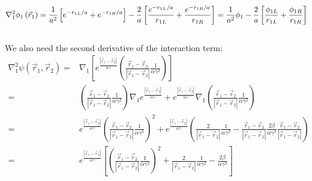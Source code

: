  \begin{align}
 \nabla _1^2{\phi _1}\left( {{{\vec r}_1}} \right) = \frac{1}{{{a^2}}}\left[ {{e^{ - {{{r_{1L}}} \mathord{\left/
  {\vphantom {{{r_{1L}}} a}} \right.
  \kern-\nulldelimiterspace} a}}} + {e^{ - {{{r_{1R}}} \mathord{\left/
  {\vphantom {{{r_{1R}}} a}} \right.
  \kern-\nulldelimiterspace} a}}}} \right] - \frac{2}{a}\left[ {\frac{{{e^{ - {{{r_{1L}}} \mathord{\left/
  {\vphantom {{{r_{1L}}} a}} \right.
  \kern-\nulldelimiterspace} a}}}}}{{{r_{1L}}}} + \frac{{{e^{ - {{{r_{1R}}} \mathord{\left/
  {\vphantom {{{r_{1R}}} a}} \right.
  \kern-\nulldelimiterspace} a}}}}}{{{r_{1R}}}}} \right] = \frac{1}{{{a^2}}}{\phi _1} - \frac{2}{a}\left[ {\frac{{{\phi _{1L}}}}{{{r_{1L}}}} + \frac{{{\phi _{1R}}}}{{{r_{1R}}}}} \right]
 \end{align}\\
 We also need the second derivative of the interaction term:
 \begin{align}
 \nabla _1^2\psi \left( {{{\vec r}_1},{{\vec r}_2}} \right) =&  \nabla _1^{}\left[ {{e^{\frac{{\left| {{{\vec r}_1} - {{\vec r}_2}} \right|}}{{\alpha \gamma }}}}\left( {\frac{{{{\vec r}_1} - {{\vec r}_2}}}{{\left| {{{\vec r}_1} - {{\vec r}_2}} \right|}}\frac{1}{{\alpha {\gamma ^2}}}} \right)} \right]\\
  =& \left( {\frac{{{{\vec r}_1} - {{\vec r}_2}}}{{\left| {{{\vec r}_1} - {{\vec r}_2}} \right|}}\frac{1}{{\alpha {\gamma ^2}}}} \right)\nabla _1^{}{e^{\frac{{\left| {{{\vec r}_1} - {{\vec r}_2}} \right|}}{{\alpha \gamma }}}} + {e^{\frac{{\left| {{{\vec r}_1} - {{\vec r}_2}} \right|}}{{\alpha \gamma }}}}\nabla _1^{}\left( {\frac{{{{\vec r}_1} - {{\vec r}_2}}}{{\left| {{{\vec r}_1} - {{\vec r}_2}} \right|}}\frac{1}{{\alpha {\gamma ^2}}}} \right)\\
  =& {e^{\frac{{\left| {{{\vec r}_1} - {{\vec r}_2}} \right|}}{{\alpha \gamma }}}}{\left( {\frac{{{{\vec r}_1} - {{\vec r}_2}}}{{\left| {{{\vec r}_1} - {{\vec r}_2}} \right|}}\frac{1}{{\alpha {\gamma ^2}}}} \right)^2} + {e^{\frac{{\left| {{{\vec r}_1} - {{\vec r}_2}} \right|}}{{\alpha \gamma }}}}\left( {\frac{2}{{\left| {{{\vec r}_1} - {{\vec r}_2}} \right|}}\frac{1}{{\alpha {\gamma ^2}}} - \frac{{{{\vec r}_1} - {{\vec r}_2}}}{{\left| {{{\vec r}_1} - {{\vec r}_2}} \right|}}\frac{{2\beta }}{{\alpha {\gamma ^3}}}\frac{{{{\vec r}_1} - {{\vec r}_2}}}{{\left| {{{\vec r}_1} - {{\vec r}_2}} \right|}}} \right)\\
  =& {e^{\frac{{\left| {{{\vec r}_1} - {{\vec r}_2}} \right|}}{{\alpha \gamma }}}}\left[ {{{\left( {\frac{{{{\vec r}_1} - {{\vec r}_2}}}{{\left| {{{\vec r}_1} - {{\vec r}_2}} \right|}}\frac{1}{{\alpha {\gamma ^2}}}} \right)}^2} + \frac{2}{{\left| {{{\vec r}_1} - {{\vec r}_2}} \right|}}\frac{1}{{\alpha {\gamma ^2}}} - \frac{{2\beta }}{{\alpha {\gamma ^3}}}} \right]
 \end{align}\\

